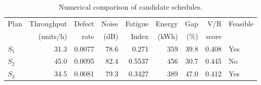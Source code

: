 \begin{table}[htbp]
\centering
\caption{Numerical comparison of candidate schedules.}
\label{tab:numerical-sim}
\small
\begin{tabular}{@{}lrrrrrrrl@{}}
\toprule
Plan & Throughput & Defect & Noise & Fatigue & Energy & Gap & V/R & Feasible \\
     & (units/h)  & rate   & (dB)  & Index   & (kWh)  & (\%) & score &         \\
\midrule
$S_{1}$ & 31.3 & 0.0077 & 78.6 & 0.271 & 359 & 39.8 & 0.408 & Yes \\
$S_{2}$ & 45.0 & 0.0095 & 82.4 & 0.5537 & 456 & 30.7 & 0.445 & No \\
$S_{3}$ & 34.5 & 0.0081 & 79.3 & 0.3427 & 389 & 47.0 & 0.412 & Yes \\
\bottomrule
\end{tabular}
\end{table}
